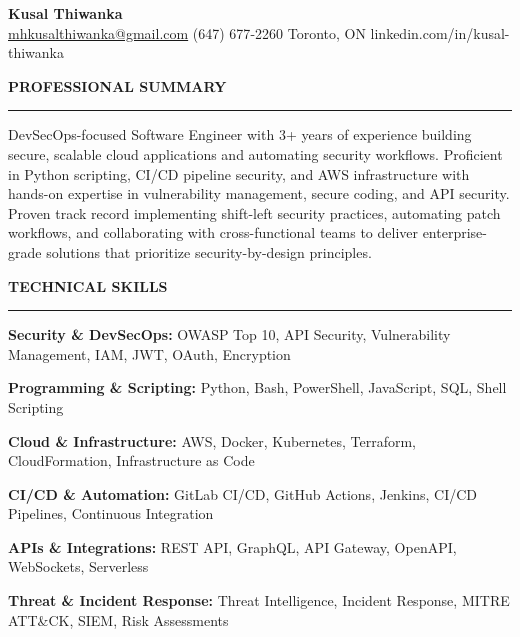 \documentclass[10pt,letterpaper]{article}
\begin{document}
\begin{center}
{\LARGE\textbf{Kusal Thiwanka}}\\[3pt]
\href{mailto:mhkusalthiwanka@gmail.com}{mhkusalthiwanka@gmail.com}\hspace{2em}%
(647) 677{-}2260\hspace{2em}%
Toronto, ON\hspace{2em}
linkedin.com/in/kusal-thiwanka
\end{center}

\vspace{6pt}

\textbf{PROFESSIONAL SUMMARY}\\[-8pt]
\noindent\rule{\textwidth}{1pt}

\vspace{-2pt}

DevSecOps-focused Software Engineer with 3+ years of experience building secure, scalable cloud applications and automating security workflows. Proficient in Python scripting, CI/CD pipeline security, and AWS infrastructure with hands-on expertise in vulnerability management, secure coding, and API security. Proven track record implementing shift-left security practices, automating patch workflows, and collaborating with cross-functional teams to deliver enterprise-grade solutions that prioritize security-by-design principles.

\vspace{8pt}

\textbf{TECHNICAL SKILLS}\\[-8pt]
\noindent\rule{\textwidth}{1pt}

\vspace{-2pt}

\textbf{Security \& DevSecOps:} OWASP Top 10, API Security, Vulnerability Management, IAM, JWT, OAuth, Encryption

\textbf{Programming \& Scripting:} Python, Bash, PowerShell, JavaScript, SQL, Shell Scripting

\textbf{Cloud \& Infrastructure:} AWS, Docker, Kubernetes, Terraform, CloudFormation, Infrastructure as Code

\textbf{CI/CD \& Automation:} GitLab CI/CD, GitHub Actions, Jenkins, CI/CD Pipelines, Continuous Integration

\textbf{APIs \& Integrations:} REST API, GraphQL, API Gateway, OpenAPI, WebSockets, Serverless

\textbf{Threat \& Incident Response:} Threat Intelligence, Incident Response, MITRE ATT\&CK, SIEM, Risk Assessments
\end{document}
